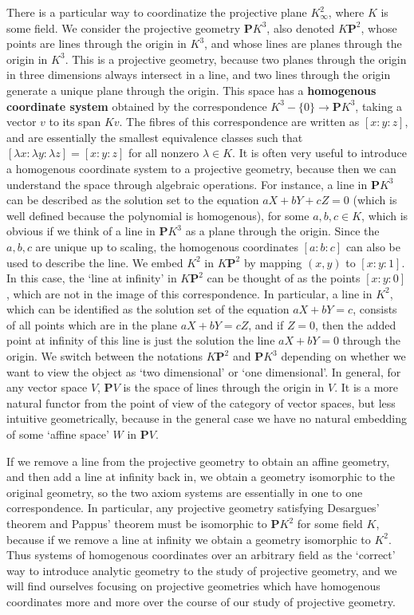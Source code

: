 \begin{example}
    There is a particular way to coordinatize the projective plane $K^2_\infty$, where $K$ is some field. We consider the projective geometry $\mathbf{P}K^3$, also denoted $K\mathbf{P}^2$, whose points are lines through the origin in $K^3$, and whose lines are planes through the origin in $K^3$. This is a projective geometry, because two planes through the origin in three dimensions always intersect in a line, and two lines through the origin generate a unique plane through the origin. This space has a {\bf homogenous coordinate system} obtained by the correspondence $K^3 - \{ 0 \} \to \mathbf{P}K^3$, taking a vector $v$ to its span $Kv$. The fibres of this correspondence are written as $[x:y:z]$, and are essentially the smallest equivalence classes such that $[\lambda x: \lambda y: \lambda z] = [x:y:z]$ for all nonzero $\lambda \in K$. It is often very useful to introduce a homogenous coordinate system to a projective geometry, because then we can understand the space through algebraic operations. For instance, a line in $\mathbf{P}K^3$ can be described as the solution set to the equation $aX + bY + cZ = 0$ (which is well defined because the polynomial is homogenous), for some $a,b,c \in K$, which is obvious if we think of a line in $\mathbf{P}K^3$ as a plane through the origin. Since the $a,b,c$ are unique up to scaling, the homogenous coordinates $[a:b:c]$ can also be used to describe the line. We embed $K^2$ in $K\mathbf{P}^2$ by mapping $(x,y)$ to $[x:y:1]$. In this case, the `line at infinity' in $K\mathbf{P}^2$ can be thought of as the points $[x:y:0]$, which are not in the image of this correspondence. In particular, a line in $K^2$, which can be identified as the solution set of the equation $aX + bY = c$, consists of all points which are in the plane $aX + bY = cZ$, and if $Z = 0$, then the added point at infinity of this line is just the solution the line $aX + bY = 0$ through the origin. We switch between the notations $K\mathbf{P}^2$ and $\mathbf{P}K^3$ depending on whether we want to view the object as `two dimensional' or `one dimensional'. In general, for any vector space $V$, $\mathbf{P}V$ is the space of lines through the origin in $V$. It is a more natural functor from the point of view of the category of vector spaces, but less intuitive geometrically, because in the general case we have no natural embedding of some `affine space' $W$ in $\mathbf{P}V$.
\end{example}

If we remove a line from the projective geometry to obtain an affine geometry, and then add a line at infinity back in, we obtain a geometry isomorphic to the original geometry, so the two axiom systems are essentially in one to one correspondence. In particular, any projective geometry satisfying Desargues' theorem and Pappus' theorem must be isomorphic to $\mathbf{P}K^2$ for some field $K$, because if we remove a line at infinity we obtain a geometry isomorphic to $K^2$. Thus systems of homogenous coordinates over an arbitrary field as the `correct' way to introduce analytic geometry to the study of projective geometry, and we will find ourselves focusing on projective geometries which have homogenous coordinates more and more over the course of our study of projective geometry.

